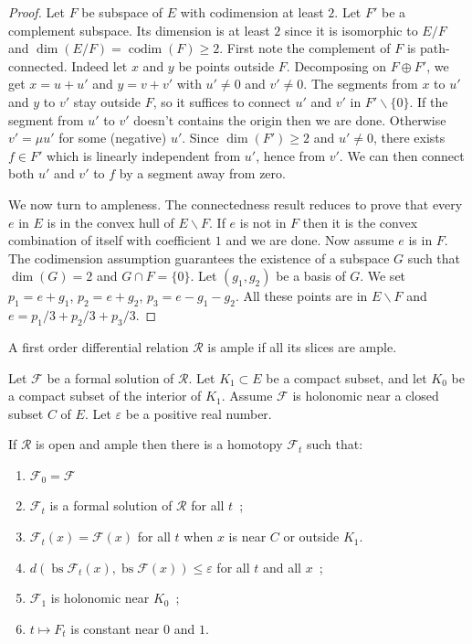 \documentclass[10pt,a4paper]{article}
\newcommand{\Rel}{\mathcal{R}} %
\DeclareMathOperator{\codim}{codim} %
\newcommand{\F}{\mathcal{F}} %
\DeclareMathOperator{\bs}{bs} %
\newcommand{\uses}[1]{}
\newcommand{\lean}[1]{}
\newcommand{\leanok}{}
\begin{document}
\begin{proof}
  \leanok
  Let $F$ be subspace of $E$ with codimension at least $2$.
  Let $F'$ be a complement subspace.
  Its dimension is at least $2$ since it is isomorphic to $E/F$
  and $\dim(E/F) = \codim(F) ≥ 2$.
  First note the complement of $F$ is path-connected.
  Indeed let $x$ and $y$ be points outside $F$.
  Decomposing on $F ⊕ F'$, we get $x = u + u'$ and $y = v + v'$
  with $u' ≠ 0$ and $v' ≠ 0$.
  The segments from $x$ to $u'$ and $y$ to $v'$ stay outside $F$,
  so it suffices to connect $u'$ and $v'$ in $F' ∖ \{0\}$.
  If the segment from $u'$ to $v'$ doesn't contains the origin then we
  are done.
  Otherwise $v' = μu'$ for some (negative) $u'$.
  Since $\dim(F') ≥ 2$ and $u' ≠ 0$, there exists $f ∈ F'$
  which is linearly independent from $u'$, hence from $v'$.
  We can then connect both $u'$ and $v'$ to $f$ by a segment
  away from zero.

  We now turn to ampleness.
  The connectedness result reduces to prove that every $e$ in $E$
  is in the convex hull of $E ∖ F$.
  If $e$ is not in $F$ then it is the convex combination of itself with
  coefficient $1$ and we are done.
  Now assume $e$ is in $F$.
  The codimension assumption guarantees the existence
  of a subspace $G$ such that $\dim(G) = 2$ and $G ∩ F = \{0\}$.
  Let $(g_1, g_2)$ be a basis of $G$.
  We set $p_1 = e + g_1$, $p_2 = e + g_2$, $p_3 = e - g_1 - g_2$.
  All these points are in $E ∖ F$ and $e = p_1/3 + p_2/3 + p_3/3$.
\end{proof}

\begin{definition}
  \label{def:ample_relation_loc}
  \leanok
  \lean{RelLoc.IsAmple}
  \uses{def:ample_subset, def:rel_slice}
  A first order differential relation $\Rel$ is ample if all its slices
  are ample.
\end{definition}

\begin{lemma}
  \label{lem:h_principle_open_ample_loc}
  \leanok
  \lean{RelLoc.FormalSol.improve}
  \uses{def:ample_relation_loc, def:holonomic_loc}
  Let $\F$ be a formal solution of $\Rel$.
  Let $K_1 ⊂ E$ be a compact subset, and let $K_0$ be a compact subset of
  the interior of $K_1$.
  Assume $\F$ is holonomic near a closed subset $C$ of $E$.
  Let $ε$ be a positive real number.

  If $\Rel$ is open and ample then there is a homotopy $\F_t$ such that:
  \begin{enumerate}
    \item
      $\F_0 = \F$
    \item
      $\F_t$ is a formal solution of $\Rel$ for all $t$~;
    \item
      $\F_t(x) = \F(x)$ for all $t$ when $x$ is near $C$ or outside $K_1$.
    \item
      $d(\bs\F_t(x), \bs \F(x)) ≤ ε$ for all $t$ and all $x$~;
    \item
      $\F_1$ is holonomic near $K_0$~;
    \item
      $t ↦ F_t$ is constant near $0$ and $1$.
  \end{enumerate}
\end{lemma}
\end{document}
